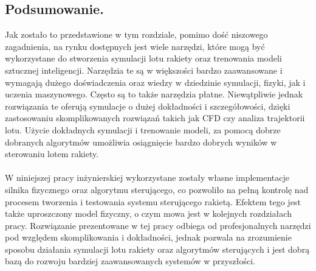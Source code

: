 \subsection{Podsumowanie.}
Jak zostało to przedstawione w tym rozdziale, pomimo dość niszowego
zagadnienia, na rynku dostępnych jest wiele
narzędzi,
które
mogą być
wykorzystane do stworzenia symulacji lotu rakiety oraz trenowania modeli
sztucznej inteligencji. Narzędzia te są w większości bardzo zaawansowane i
wymagają dużego doświadczenia oraz wiedzy w dziedzinie symulacji, fizyki, jak
i uczenia maszynowego. Często są to także narzędzia płatne. Niewątpliwie
jednak rozwiązania te oferują symulacje o dużej dokładności i
szczegółowości, dzięki zastosowaniu skomplikowanych rozwiązań takich jak CFD
czy analiza trajektorii lotu. Użycie dokładnych symulacji i trenowanie
modeli, za pomocą dobrze dobranych algorytmów umożliwia osiągnięcie bardzo
dobrych wyników w sterowaniu lotem rakiety.\\
\\ W niniejszej pracy inżynierskiej wykorzystane zostały własne implementacje silnika fizycznego oraz algorytmu sterującego,
co pozwoliło na pełną kontrolę nad procesem tworzenia i testowania systemu sterującego rakietą.
Efektem tego jest także uproszczony model fizyczny, o czym mowa jest w kolejnych rozdziałach pracy.
Rozwiązanie prezentowane w tej pracy odbiega od profesjonalnych narzędzi pod względem skomplikowania i dokładności,
jednak pozwala na zrozumienie sposobu działania symulacji lotu rakiety oraz algorytmów sterujących i jest
dobrą bazą do rozwoju bardziej zaawansowanych systemów w przyszłości.
